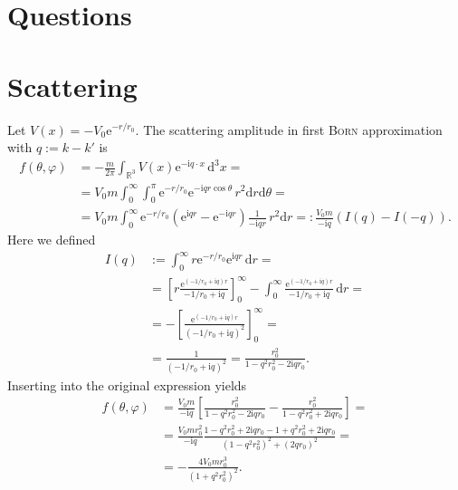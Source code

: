 \documentclass[english, parskip=full]{scrartcl}
\title{\titel}
\author{\autor}
\date{\today}
\newcommand{\intx}{}
\newcommand{\intr}{}
\newcommand{\kla}{}
\newcommand{\klam}{}
\def\I{\text{i}}
\def\e{\text{e}}
\begin{document}
\maketitle  %
\section{Questions}
\section{Scattering}
Let $V(x)=-V_0\e^{-r/r_0}$.
The scattering amplitude in first \textsc{Born} approximation with $q:=k-k'$ is
\begin{align}
f(\theta,\varphi)&=-\frac{m}{2\pi}\intr\int_{\mathbb{R}^{3}}V(x)\e^{-\I q\cdot x}\,\mathrm{d}^{3}x=\\
&=V_0m\intx\int_{0}^{\infty}\int_0^\pi\e^{-r/r_0}\e^{-\I qr\cos\theta}\,r^2\mathrm{d}r\mathrm{d}\theta=\\
&=V_0m\intx\int_{0}^{\infty}\e^{-r/r_0}\kla\left( {\e^{\I qr}-\e^{-\I qr}} \right)\frac{1}{-\I qr}\,r^2\mathrm{d}r=:\frac{V_0m}{-\I q}\kla\left( {I(q)-I(-q)} \right).
\end{align}
Here we defined 
\begin{align}
I(q)&:=\intx\int_{0}^{\infty}r\e^{-r/r_0}\e^{\I qr}\,\mathrm{d}r=\\
&=\klam\left[ r\frac{\e^{(-1/r_0+\I q)r}}{-1/r_0+\I q} \right]_0^\infty-\intx\int_{0}^{\infty}\frac{\e^{(-1/r_0+\I q)r}}{-1/r_0+\I q}\,\mathrm{d}r=\\
&=-\klam\left[ \frac{\e^{(-1/r_0+\I q)r}}{(-1/r_0+\I q)^2} \right]_0^\infty=\\
&=\frac{1}{(-1/r_0 +\I q)^2}=\frac{r_0^2}{1-q^2r_0^2-2\I qr_0}.
\end{align}
Inserting into the original expression yields
\begin{align}
f(\theta,\varphi)&=\frac{V_0m}{-\I q}\klam\left[ {\frac{r_0^2}{1-q^2r_0^2-2\I qr_0}-\frac{r_0^2}{1-q^2r_0^2+2\I qr_0}} \right]=\\
&=\frac{V_0mr_0^2}{-\I q}\frac{1-q^2r_0^2+2\I qr_0-1+q^2r_0^2+2\I qr_0}{(1-q^2r_0^2)^2+(2qr_0)^2}=\\
&=-\frac{4V_0mr_0^3}{(1+q^2r_0^2)^2}.
\end{align}
\end{document}
